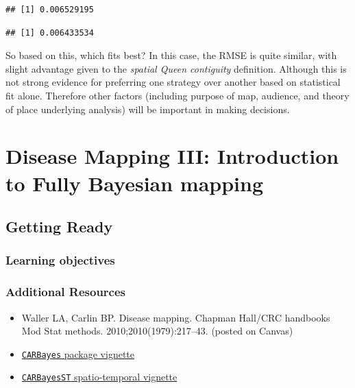 \documentclass[
]{book}
\newenvironment{Shaded}{\begin{snugshade}}{\end{snugshade}}
\newcommand{\FunctionTok}[1]{\textcolor[rgb]{0.13,0.29,0.53}{\textbf{#1}}}
\newcommand{\NormalTok}[1]{#1}
\newcommand{\SpecialCharTok}[1]{\textcolor[rgb]{0.81,0.36,0.00}{\textbf{#1}}}
\providecommand{\tightlist}{%
  \setlength{\itemsep}{0pt}\setlength{\parskip}{0pt}}
\begin{document}
\begin{verbatim}
## [1] 0.006529195
\end{verbatim}

\begin{Shaded}
\end{Shaded}

\begin{verbatim}
## [1] 0.006433534
\end{verbatim}

So based on this, which fits best? In this case, the RMSE is quite similar, with slight advantage given to the \emph{spatial Queen contiguity} definition. Although this is not strong evidence for preferring one strategy over another based on statistical fit alone. Therefore other factors (including purpose of map, audience, and theory of place underlying analysis) will be important in making decisions.

\hypertarget{disease-mapping-iii-introduction-to-fully-bayesian-mapping}{%
\chapter{Disease Mapping III: Introduction to Fully Bayesian mapping}\label{disease-mapping-iii-introduction-to-fully-bayesian-mapping}}

\hypertarget{getting-ready-4}{%
\section{Getting Ready}\label{getting-ready-4}}

\hypertarget{learning-objectives-5}{%
\subsection{Learning objectives}\label{learning-objectives-5}}

\hypertarget{additional-resources-5}{%
\subsection{Additional Resources}\label{additional-resources-5}}

\begin{itemize}
\tightlist
\item
  Waller LA, Carlin BP. Disease mapping. Chapman Hall/CRC handbooks Mod Stat methods. 2010;2010(1979):217--43. (posted on Canvas)
\item
  \href{https://cran.r-project.org/web/packages/CARBayes/vignettes/CARBayes.pdf}{\texttt{CARBayes} package vignette}
\item
  \href{https://cran.r-project.org/web/packages/CARBayes/vignettes/CARBayes.pdf}{\texttt{CARBayesST} spatio-temporal vignette}
\end{itemize}
\end{document}
